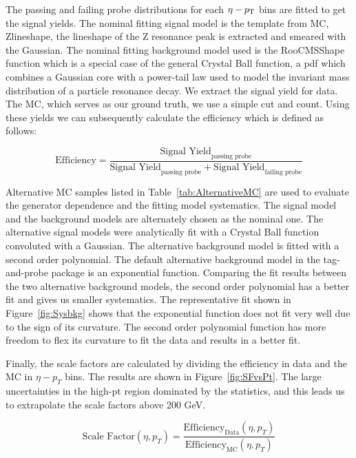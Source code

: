 The passing and failing probe distributions for each $\eta-p_{\mathrm{T}}$ bins are fitted to get the signal yields. The nominal fitting signal model is the template from MC, Zlineshape, the lineshape of the Z resonance peak is extracted and smeared with the Gaussian. The nominal fitting background model used is the RooCMSShape function which is a special case of the general Crystal Ball function, a pdf which combines a Gaussian core with a power-tail law used to model the invariant mass distribution of a particle resonance decay. We extract the signal yield for data. The MC, which serves as our ground truth, we use a simple cut and count. Using these yields we can subsequently calculate the efficiency which is defined as follows: 

\begin{equation} \label{eq:efficiency}
  \text{Efficiency} = \frac{\text{Signal Yield}_{\text{passing probe}}}{\text{Signal Yield}_{\text{passing probe}} + \text{Signal Yield}_{\text{failing probe}}}
\end{equation}

Alternative MC samples listed in Table~\ref{tab:AlternativeMC} are used to evaluate the generator dependence and the fitting model systematics. The signal model and the background models are alternately chosen as the nominal one. The alternative signal models were analytically fit with a Crystal Ball function convoluted with a Gaussian. The alternative background model is fitted with a second order polynomial. The default alternative background model in the tag-and-probe package is an exponential function. Comparing the fit results between the two alternative background models, the second order polynomial has a better fit and gives us smaller systematics.  The representative fit shown in Figure~\ref{fig:Sysbkg} shows that the exponential function does not fit very well due to the sign of its curvature. The second order polynomial function has more freedom to flex its curvature to fit the data and results in a better fit. 

Finally, the scale factors are calculated by dividing the efficiency in data and the MC in $\eta-p_{T}$ bins. The results are shown in Figure~\ref{fig:SFvsPt}. The large uncertainties in the high-pt region dominated by the statistics, and this leads us to extrapolate the scale factors above 200 GeV.

\begin{equation} \label{eq:SF}
  \text{Scale Factor}(\eta,p_{T}) = \frac{\text{Efficiency}_{\text{Data}}(\eta,p_{T})}{\text{Efficiency}_{\text{MC}}(\eta,p_{T})}
\end{equation}


